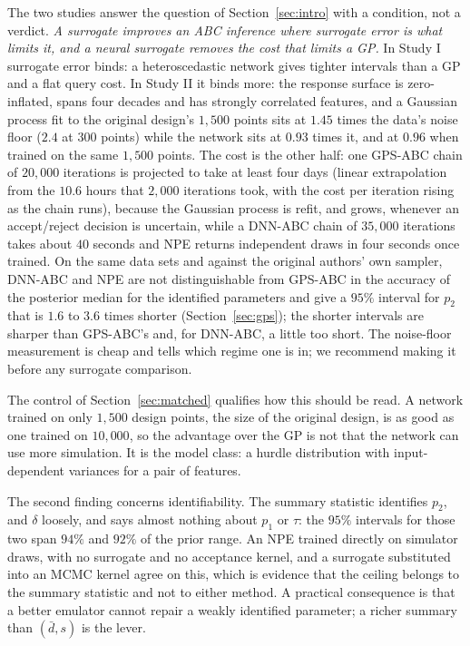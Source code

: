 \documentclass[sn-basic,iicol,pdflatex]{sn-jnl}
\begin{document}
The two studies answer the question of Section~\ref{sec:intro} with a condition,
not a verdict. \emph{A surrogate improves an ABC inference where surrogate error
is what limits it, and a neural surrogate removes the cost that limits a GP.}
In Study I surrogate error binds: a heteroscedastic network gives tighter
intervals than a GP and a flat query cost. In Study II it binds more: the response
surface is zero-inflated, spans four decades and has strongly correlated features, and a
Gaussian process fit to the original design's $1{,}500$ points sits at $1.45$ times the data's noise
floor ($2.4$ at $300$ points) while the network sits at $0.93$ times it, and at $0.96$ when trained on the same $1{,}500$ points. The cost is the other half: one
GPS-ABC chain of $20{,}000$ iterations is projected to take at least four days (linear extrapolation from the $10.6$ hours that $2{,}000$ iterations took, with the cost per iteration rising as the chain runs), because the Gaussian process is refit, and grows,
whenever an accept/reject decision is uncertain, while a DNN-ABC chain of $35{,}000$ iterations takes about $40$ seconds
and NPE returns independent draws in four seconds once trained. On the same data sets and against the original authors' own sampler, DNN-ABC and NPE are not distinguishable from GPS-ABC in the accuracy of the posterior median for the identified parameters and give a $95\%$ interval for $p_2$ that is $1.6$ to $3.6$ times shorter (Section~\ref{sec:gps}); the shorter intervals are sharper than GPS-ABC's and, for DNN-ABC, a little too short.
The noise-floor measurement is cheap and tells which regime one is in; we recommend making it before any
surrogate comparison.

The control of Section~\ref{sec:matched} qualifies how this should be read. A network
trained on only $1{,}500$ design points, the size of the original design, is as good as one
trained on $10{,}000$, so the advantage over the GP is not that the network can use more simulation.
It is the model class: a hurdle distribution with input-dependent variances for a pair of features.

The second finding concerns identifiability. The summary statistic identifies
$p_2$, and $\delta$ loosely, and says almost nothing about $p_1$ or $\tau$: the $95\%$ intervals
for those two span $94\%$ and $92\%$ of the prior range. An NPE trained directly on simulator draws, with no
surrogate and no acceptance kernel, and a surrogate substituted into an MCMC kernel agree on this, which is evidence that the
ceiling belongs to the summary statistic and not to either method. A practical consequence is that a better emulator cannot
repair a weakly identified parameter; a richer summary than $(\bar d,s)$ is the lever.
\end{document}
